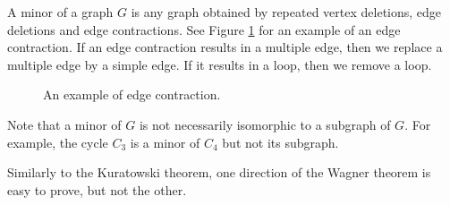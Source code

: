 

\setcounter{section}{3}
\setcounter{subsection}{3}
\setcounter{dfn}{11}


A minor of a graph $G$ is any graph obtained by repeated vertex deletions, edge deletions and edge contractions.
See Figure \ref{fig:K5Contraction} for an example of an edge contraction.
If an edge contraction results in a multiple edge, then we replace a multiple edge by a simple edge.
If it results in a loop, then we remove a loop.

\begin{figure}[ht]
\begin{center}

\end{center}
\caption{An example of edge contraction.}
\label{fig:K5Contraction}
\end{figure}

Note that a minor of $G$ is not necessarily isomorphic to a subgraph of $G$.
For example, the cycle $C_3$ is a minor of $C_4$ but not its subgraph.

Similarly to the Kuratowski theorem, one direction of the Wagner theorem is easy to prove, but not the other.





